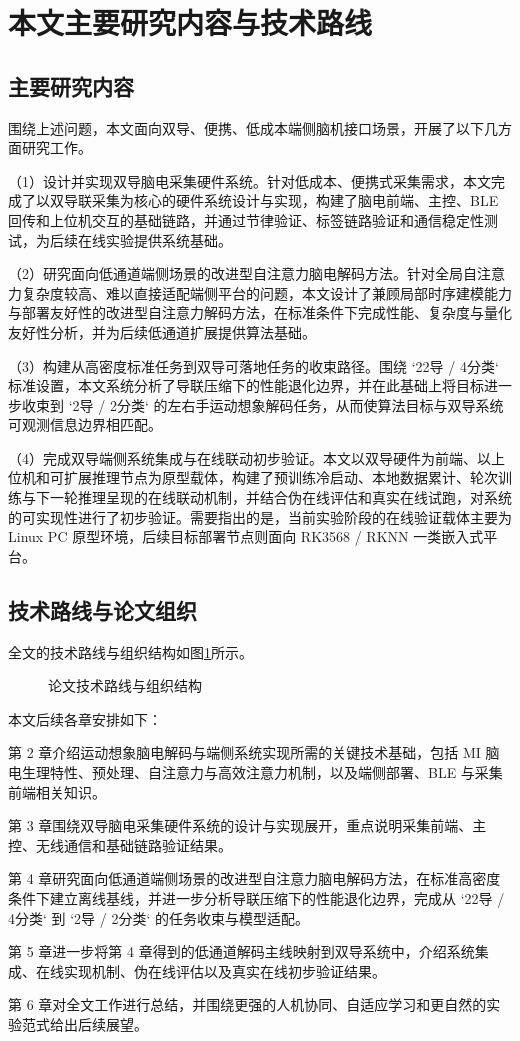 \section{本文主要研究内容与技术路线}
\subsection{主要研究内容}

围绕上述问题，本文面向双导、便携、低成本端侧脑机接口场景，开展了以下几方面研究工作。

\noindent
（1）设计并实现双导脑电采集硬件系统。针对低成本、便携式采集需求，本文完成了以双导联采集为核心的硬件系统设计与实现，构建了脑电前端、主控、BLE 回传和上位机交互的基础链路，并通过节律验证、标签链路验证和通信稳定性测试，为后续在线实验提供系统基础。

\noindent
（2）研究面向低通道端侧场景的改进型自注意力脑电解码方法。针对全局自注意力复杂度较高、难以直接适配端侧平台的问题，本文设计了兼顾局部时序建模能力与部署友好性的改进型自注意力解码方法，在标准条件下完成性能、复杂度与量化友好性分析，并为后续低通道扩展提供算法基础。

\noindent
（3）构建从高密度标准任务到双导可落地任务的收束路径。围绕 `22导 / 4分类` 标准设置，本文系统分析了导联压缩下的性能退化边界，并在此基础上将目标进一步收束到 `2导 / 2分类` 的左右手运动想象解码任务，从而使算法目标与双导系统可观测信息边界相匹配。

\noindent
（4）完成双导端侧系统集成与在线联动初步验证。本文以双导硬件为前端、以上位机和可扩展推理节点为原型载体，构建了预训练冷启动、本地数据累计、轮次训练与下一轮推理呈现的在线联动机制，并结合伪在线评估和真实在线试跑，对系统的可实现性进行了初步验证。需要指出的是，当前实验阶段的在线验证载体主要为 Linux PC 原型环境，后续目标部署节点则面向 RK3568 / RKNN 一类嵌入式平台。

\subsection{技术路线与论文组织}

全文的技术路线与组织结构如图\ref{fig:org}所示。
\begin{figure}[htbp]
  \centering
  \caption{论文技术路线与组织结构}
  \label{fig:org}
\end{figure}

\noindent
本文后续各章安排如下：

\noindent
第 2 章介绍运动想象脑电解码与端侧系统实现所需的关键技术基础，包括 MI 脑电生理特性、预处理、自注意力与高效注意力机制，以及端侧部署、BLE 与采集前端相关知识。

\noindent
第 3 章围绕双导脑电采集硬件系统的设计与实现展开，重点说明采集前端、主控、无线通信和基础链路验证结果。

\noindent
第 4 章研究面向低通道端侧场景的改进型自注意力脑电解码方法，在标准高密度条件下建立离线基线，并进一步分析导联压缩下的性能退化边界，完成从 `22导 / 4分类` 到 `2导 / 2分类` 的任务收束与模型适配。

\noindent
第 5 章进一步将第 4 章得到的低通道解码主线映射到双导系统中，介绍系统集成、在线实现机制、伪在线评估以及真实在线初步验证结果。

\noindent
第 6 章对全文工作进行总结，并围绕更强的人机协同、自适应学习和更自然的实验范式给出后续展望。
